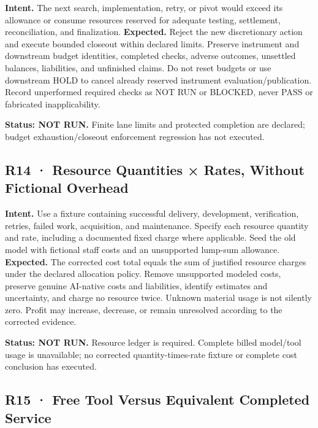\documentclass[10pt,letterpaper]{article}
\begin{document}
\textbf{Intent.} The next search, implementation, retry, or pivot would
exceed its allowance or consume resources reserved for adequate testing,
settlement, reconciliation, and finalization. \textbf{Expected.} Reject
the new discretionary action and execute bounded closeout within
declared limits. Preserve instrument and downstream budget identities,
completed checks, adverse outcomes, unsettled balances, liabilities, and
unfinished claims. Do not reset budgets or use downstream HOLD to cancel
already reserved instrument evaluation/publication. Record unperformed
required checks as NOT RUN or BLOCKED, never PASS or fabricated
inapplicability.

\textbf{Status: NOT RUN.} Finite lane limits and protected completion
are declared; budget exhaustion/closeout enforcement regression has not
executed.

\hypertarget{r14-resource-quantities-rates-without-fictional-overhead}{%
\subsection{R14 · Resource Quantities × Rates, Without Fictional
Overhead}\label{r14-resource-quantities-rates-without-fictional-overhead}}

\textbf{Intent.} Use a fixture containing successful delivery,
development, verification, retries, failed work, acquisition, and
maintenance. Specify each resource quantity and rate, including a
documented fixed charge where applicable. Seed the old model with
fictional staff costs and an unsupported lump-sum allowance.
\textbf{Expected.} The corrected cost total equals the sum of justified
resource charges under the declared allocation policy. Remove
unsupported modeled costs, preserve genuine AI-native costs and
liabilities, identify estimates and uncertainty, and charge no resource
twice. Unknown material usage is not silently zero. Profit may increase,
decrease, or remain unresolved according to the corrected evidence.

\textbf{Status: NOT RUN.} Resource ledger is required. Complete billed
model/tool usage is unavailable; no corrected quantity-times-rate
fixture or complete cost conclusion has executed.

\hypertarget{r15-free-tool-versus-equivalent-completed-service}{%
\subsection{R15 · Free Tool Versus Equivalent Completed
Service}\label{r15-free-tool-versus-equivalent-completed-service}}
\end{document}

